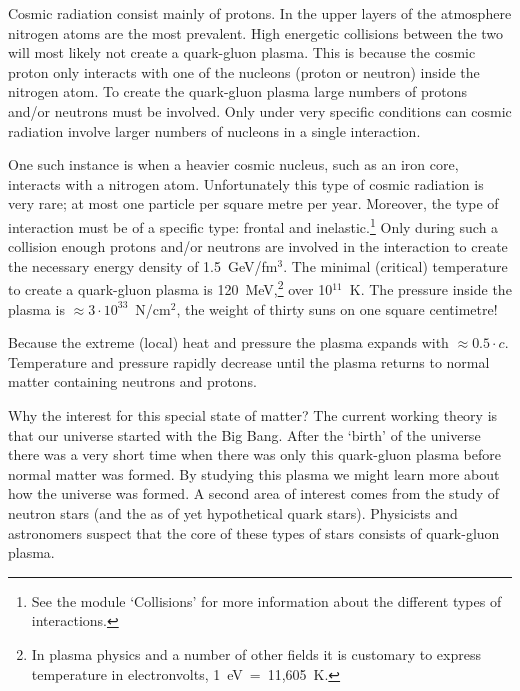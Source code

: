 \documentclass[12pt,a4paper]{article}
\numberwithin{equation}{section}
\numberwithin{figure}{section}
\numberwithin{table}{section}
\begin{document}
Cosmic radiation consist mainly of protons. In the upper layers of the atmosphere nitrogen atoms are the most prevalent. High energetic collisions between the two will most likely not create a quark-gluon plasma. This is because the cosmic proton only interacts with one of the nucleons (proton or neutron) inside the nitrogen atom. To create the quark-gluon plasma large numbers of protons and/or neutrons must be involved. Only under very specific conditions can cosmic radiation involve larger numbers of nucleons in a single interaction.

One such instance is when a heavier cosmic nucleus, such as an iron core, interacts with a nitrogen atom. Unfortunately this type of cosmic radiation is very rare; at most one particle per square metre per year. Moreover, the type of interaction must be of a specific type: frontal and inelastic.\footnote{See the module `Collisions' for more information about the different types of interactions.} Only during such a collision enough protons and/or neutrons are involved in the interaction to create the necessary energy density of 1.5~GeV/fm$^3$. The minimal (critical) temperature to create a quark-gluon plasma is 120~MeV,\footnote{In plasma physics and a number of other fields it is customary to express temperature in electronvolts, 1~eV~=~11,605~K.} over 10$^{11}$~K. The pressure inside the plasma is $\approx 3 \cdot 10^33$~N/cm$^2$, the weight of thirty suns on one square centimetre!

Because the extreme (local) heat and pressure the plasma expands with $\approx 0.5 \cdot c$. Temperature and pressure rapidly decrease until the plasma returns to normal matter containing neutrons and protons.

Why the interest for this special state of matter? The current working theory is that our universe started with the Big Bang. After the `birth' of the universe there was a very short time when there was only this quark-gluon plasma before normal matter was formed. By studying this plasma we might learn more about how the universe was formed. A second area of interest comes from the study of neutron  stars (and the as of yet hypothetical quark stars). Physicists and astronomers suspect that the core of these types of stars consists of quark-gluon plasma.
 
\end{document}
